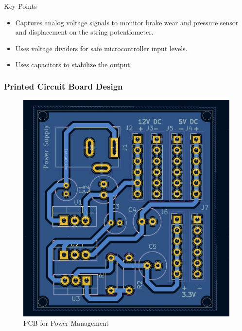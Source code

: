 \documentclass[8pt,compress,aspectratio=169]{beamer}
\begin{document}
\begin{frame}
\begin{minipage}{0.49\textwidth}
    \vspace{-0.5cm}
    \begin{block}{Key Points}
      \begin{itemize}
        \item Captures analog voltage signals to monitor brake wear and pressure sensor and displacement on the string potentiometer.
        \item Uses voltage dividers for safe microcontroller input levels.
        \item Uses capacitors to stabilize the output.
      \end{itemize}
    \end{block}
  \end{minipage}
\end{frame}
\begin{frame}
  \frametitle{Printed Circuit Board Design}
  \begin{minipage}{0.3\textwidth}
    \begin{figure}
      \includegraphics[width=\textwidth]{assets/electronic/pwrsupply_pcb.jpg}
      \caption{PCB for Power Management}
    \end{figure}
  \end{minipage}
  \hfill
  \begin{minipage}{0.675\textwidth}

\end{minipage}
\end{frame}
\end{document}
